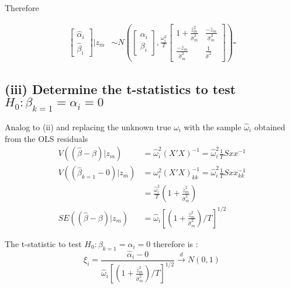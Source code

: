 \documentclass[]{article}
\begin{document}
Therefore

\begin{align*}
	\left[\begin{array}{c}
		\hat{\alpha}_i \\
		\hat{\beta}_i
	\end{array}\right] | z_m &\sim N\left(
	\left[\begin{array}{c}
		\alpha_i \\
		\beta_i
	\end{array}\right], 
	\frac{\omega_i^2}{T} \left[\begin{array}{cc}
		1 + \frac{\bar{z}_m^2}{\hat{\sigma}_m^2} & \frac{-\bar{z}_m}{\hat{\sigma}_m^2} \\
		\frac{-\bar{z}_m}{\hat{\sigma}_m^2} & \frac{1}{\hat{\sigma}^2}
	\end{array}\right]
	\right) \square
\end{align*}

\subsection{(iii) Determine the t-statistics to test $H_0: \beta_{k=1} = \alpha_i = 0$}

Analog to (ii) and replacing the unknown true $\omega_i$ with the sample $\hat{\omega}_i$ obtained from the OLS residuals
\begin{align*}
	V((\hat{\beta} - \beta)|z_m) &= \hat{\omega}_i^2 (X'X)^{-1} = \hat{\omega}_i^2 \frac{1}{T}Sxx^{-1}\\
	V((\hat{\beta}_{k=1} - 0)|z_m) &= \omega_i^2 (X'X)_{kk}^{-1} = \hat{\omega}_i^2 \frac{1}{T}Sxx_{kk}^{-1}\\
	&=  \frac{\hat{\omega}_i^2}{T}(1+\frac{\bar{z}_m^2}{\hat{\sigma}_m^2})\\
	SE((\hat{\beta} - \beta)|z_m) &= \hat{\omega}_i[(1+\frac{\bar{z}_m^2}{\hat{\sigma}_m^2})/T]^{1/2}
\end{align*}

The t-statistic to test $H_0: \beta_{k=1} = \alpha_i = 0$ therefore is : $$ \xi_i = \frac{\hat{\alpha}_i - 0}{\hat{\omega}_i[(1+\frac{\bar{z}_m^2}{\hat{\sigma}_m^2})/T]^{1/2}}  \xrightarrow{d}  N(0,1)$$
\end{document}
